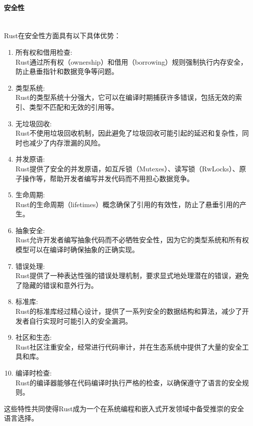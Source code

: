 \documentclass{ctexart}
\begin{document}
\paragraph{安全性}\ \\
\indent Rust在安全性方面具有以下具体优势：
\begin{enumerate}
\item 所有权和借用检查:\\
Rust通过所有权（ownership）和借用（borrowing）规则强制执行内存安全，防止悬垂指针和数据竞争等问题。
\item 类型系统:\\
Rust的类型系统十分强大，它可以在编译时期捕获许多错误，包括无效的索引、类型不匹配和无效的引用等。
\item 无垃圾回收:\\
Rust不使用垃圾回收机制，因此避免了垃圾回收可能引起的延迟和复杂性，同时也减少了内存泄漏的风险。
\item 并发原语:\\
   Rust提供了安全的并发原语，如互斥锁（Mutexes）、读写锁（RwLocks）、原子操作等，帮助开发者编写并发代码而不用担心数据竞争。
\item 生命周期:\\
   Rust的生命周期（lifetimes）概念确保了引用的有效性，防止了悬垂引用的产生。
\item 抽象安全:\\
   Rust允许开发者编写抽象代码而不必牺牲安全性，因为它的类型系统和所有权模型可以在编译时确保抽象的正确实现。
\item 错误处理:\\
   Rust提供了一种表达性强的错误处理机制，要求显式地处理潜在的错误，避免了隐藏的错误和意外行为。
\item 标准库:\\
   Rust的标准库经过精心设计，提供了一系列安全的数据结构和算法，减少了开发者自行实现时可能引入的安全漏洞。
\item 社区和生态:\\
   Rust社区注重安全，经常进行代码审计，并在生态系统中提供了大量的安全工具和库。
\item 编译时检查:\\
    Rust的编译器能够在代码编译时执行严格的检查，以确保遵守了语言的安全规则。
\end{enumerate}
这些特性共同使得Rust成为一个在系统编程和嵌入式开发领域中备受推崇的安全语言选择。
\end{document}
